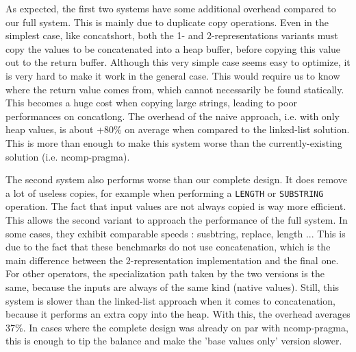 \documentclass[twoside,11pt,a4paper]{article}
\newcommand{\pls}[1]{\small\texttt{#1}\normalsize}
\newcommand{\benchsystem}[1]{\textsf{#1}}
\newcommand{\ncpg}{\benchsystem{ncomp-pragma}}
\newcommand{\bench}[1]{\textsf{#1}}
\begin{document}
As expected, the first two systems have some additional overhead compared to our full system. This is mainly due to duplicate copy operations. Even in the simplest case, like \bench{concatshort}, both the 1- and 2-representations variants must copy the values to be concatenated into a heap buffer, before copying this value out to the return buffer. Although this very simple case seems easy to optimize, it is very hard to make it work in the general case. This would require us to know where the return value comes from, which cannot necessarily be found statically. This becomes a huge cost when copying large strings, leading to poor performances on \bench{concatlong}. The overhead of the naive approach, i.e. with only heap values, is about +80\% on average when compared to the linked-list solution. This is more than enough to make this system worse than the currently-existing solution (i.e. \ncpg{}).

The second system also performs worse than our complete design. It does remove a lot of useless copies, for example when performing a \pls{LENGTH} or \pls{SUBSTRING} operation. The fact that input values are not always copied is way more efficient. This allows the second variant to approach the performance of the full system. In some cases, they exhibit comparable speeds : \bench{susbtring}, \bench{replace}, \bench{length} ... This is due to the fact that these benchmarks do not use concatenation, which is the main difference between the 2-representation implementation and the final one. For other operators, the specialization path taken by the two versions is the same, because the inputs are always of the same kind (native values). Still, this system is slower than the linked-list approach when it comes to concatenation, because it performs an extra copy into the heap. With this, the overhead averages 37\%. In cases where the complete design was already on par with \ncpg{}, this is enough to tip the balance and make the 'base values only' version slower.
\end{document}
